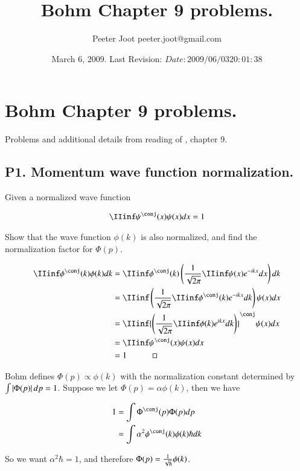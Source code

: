 \documentclass{article}
\title{ Bohm Chapter 9 problems. }
\author{Peeter Joot \quad peeter.joot@gmail.com }
\date{ March 6, 2009.  Last Revision: $Date: 2009/06/03 20:01:38 $ }
\begin{document}
\maketitle{}

\tableofcontents

\section{Bohm Chapter 9 problems. }

Problems and additional details from reading of \cite{bohm1989qt}, chapter 9.

\subsection{P1. Momentum wave function normalization. }

Given a normalized wave function

\begin{align*}
\IIinf \psi^\conj(x) \psi(x) dx = 1
\end{align*}

Show that the wave function $\phi(k)$ is also normalized, and find the normalization factor for $\Phi(p)$.

\begin{align*}
\IIinf \phi^\conj(k) \phi(k) dk 
&= 
\IIinf \phi^\conj(k) \left( \inv{\sqrt{2\pi}} \IIinf \psi(x) e^{-i k x} dx \right) dk  \\
&= 
\IIinf \left( \inv{\sqrt{2\pi}} \IIinf \phi^\conj(k) e^{-i k x} dk \right) \psi(x) dx  \\
&= 
\IIinf {\left( \inv{\sqrt{2\pi}} \IIinf \phi(k) e^{i k x} dk \right)}^\conj \psi(x) dx  \\
&= 
\IIinf \psi^\conj(x) \psi(x) dx  \\
&= 1 \quad\quad\quad \square
\end{align*}

Bohm defines $\Phi(p) \propto \phi(k)$ with the normalization constant determined by $\int \left\lvert{\Phi(p)}\right\rvert dp = 1$.  Suppose we 
let $\Phi(p) = \alpha \phi(k)$, then we have

\begin{align*}
1 
&= \int \Phi^\conj(p) \Phi(p) dp \\
&= \int \alpha^2 \phi^\conj(k) \phi(k) \hbar d k
\end{align*}

So we want $\alpha^2 \hbar = 1$, and therefore $\Phi(p) = \frac{1}{\sqrt{\hbar}} \phi(k)$.
\end{document}
